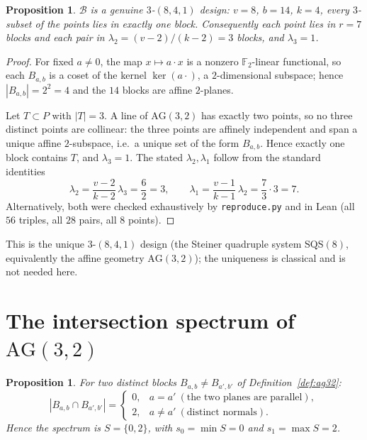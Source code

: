 \documentclass[11pt]{article}
\newtheorem{proposition}[theorem]{Proposition}
\theoremstyle{definition}
\theoremstyle{remark}
\newcommand{\F}{\mathbb{F}}
\newcommand{\AG}{\mathrm{AG}}
\begin{document}
\begin{proposition}\label{prop:sqs}
$\mathcal{B}$ is a genuine $3$-$(8,4,1)$ design: $v = 8$, $b = 14$,
$k = 4$, every $3$-subset of the points lies in exactly one block.
Consequently each point lies in $r = 7$ blocks and each pair in
$\lambda_2 = (v-2)/(k-2) = 3$ blocks, and $\lambda_3 = 1$.
\end{proposition}

\begin{proof}
For fixed $a \neq 0$, the map $x \mapsto a\cdot x$ is a nonzero $\F_2$-linear
functional, so each $B_{a,b}$ is a coset of the kernel $\ker(a\cdot)$, a
$2$-dimensional subspace; hence $|B_{a,b}| = 2^2 = 4$ and the $14$ blocks are
affine $2$-planes.

Let $T \subset P$ with $|T| = 3$. A line of $\AG(3,2)$ has exactly two points,
so no three distinct points are collinear: the three points are affinely
independent and span a unique affine $2$-subspace, i.e.\ a unique set of the
form $B_{a,b}$. Hence exactly one block contains $T$, and
$\lambda_3 = 1$. The stated $\lambda_2,\lambda_1$ follow from the standard
identities
\[
\lambda_2 = \frac{v-2}{k-2}\,\lambda_3 = \frac{6}{2} = 3,
\qquad
\lambda_1 = \frac{v-1}{k-1}\,\lambda_2 = \frac{7}{3}\cdot 3 = 7 .
\]
Alternatively, both were checked exhaustively by \texttt{reproduce.py} and in
Lean (all $56$ triples, all $28$ pairs, all $8$ points).
\end{proof}

This is the unique $3$-$(8,4,1)$ design (the Steiner quadruple system
$\mathrm{SQS}(8)$, equivalently the affine geometry $\AG(3,2)$); the
uniqueness is classical and is not needed here.

\section{The intersection spectrum of $\AG(3,2)$}

\begin{proposition}\label{prop:spectrum}
For two distinct blocks $B_{a,b} \neq B_{a',b'}$ of Definition~\ref{def:ag32}:
\[
|B_{a,b} \cap B_{a',b'}|
=
\begin{cases}
0, & a = a' \ (\text{the two planes are parallel}),\\[2pt]
2, & a \neq a' \ (\text{distinct normals}).
\end{cases}
\]
Hence the spectrum is $S = \{0,2\}$, with $s_0 = \min S = 0$ and
$s_1 = \max S = 2$.
\end{proposition}
\end{document}
